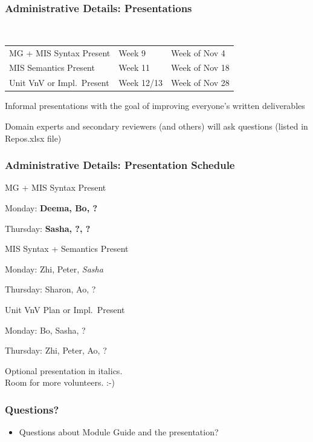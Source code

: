 \documentclass[t, 12pt, numbers, fleqn, handout]{beamer}
\begin{document}

\begin{frame}
\frametitle{Administrative Details: Presentations}

~\newline
\begin{tabular}{l l l}
MG + MIS Syntax Present & Week 9 & Week of Nov 4\\
MIS Semantics Present & Week 11 & Week of Nov 18\\
Unit VnV or Impl.\ Present & Week 12/13 & Week of Nov 28\\
\end {tabular}

\bi
\item Informal presentations with the goal of improving everyone's written
  deliverables
\item Domain experts and secondary reviewers (and others) will ask questions
  (listed in Repos.xlsx file)
\ei

\end{frame}


\begin{frame}
\frametitle{Administrative Details: Presentation Schedule}

\bi
\item MG + MIS Syntax Present
\bi
\item Monday:  \textbf{Deema, Bo, ?}
\item Thursday: \textbf{Sasha, ?, ?}
\ei
\item MIS Syntax + Semantics Present
\bi
\item Monday: Zhi, Peter, \emph{Sasha}
\item Thursday:  Sharon, Ao, ?
\ei
\item Unit VnV Plan or Impl.\ Present
\bi
\item Monday: Bo, Sasha, ?
\item Thursday: Zhi, Peter, Ao, ?
\ei
\ei

Optional presentation in italics.\\
Room for more volunteers.  :-)

\end{frame}


\begin{frame}
\frametitle{Questions?}
\begin{itemize}
\item Questions about Module Guide and the presentation?
\end{itemize}
\end{frame}
\end{document}
